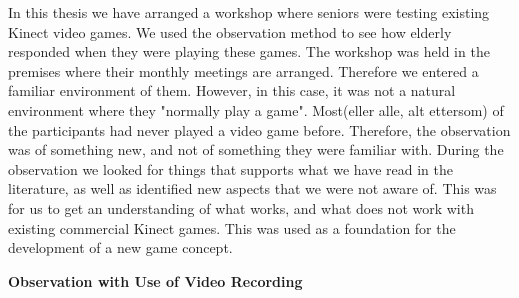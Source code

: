In this thesis we have arranged a workshop where seniors were testing existing Kinect video games. We used the observation method to see how elderly responded when they were playing these games. The workshop was held in the premises where their monthly meetings are arranged. Therefore we entered a familiar environment of them. However, in this case, it was not a natural environment where they "normally play a game". Most(eller alle, alt ettersom) of the participants had never played a video game before. Therefore, the observation was of something new, and not of something they were familiar with. During the observation we looked for things that supports what we have read in the literature, as well as identified new aspects that we were not aware of. This was for us to get an understanding of what works, and what does not work with existing commercial Kinect games. This was used as a foundation for the development of a new game concept. 

\textbf{Observation with Use of Video Recording}

